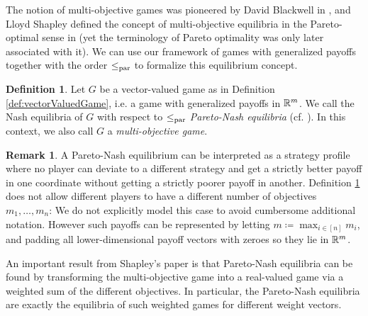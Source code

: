 \documentclass[a4paper,DIV=11]{scrreprt}
\theoremstyle{definition}
\newtheorem{defn}[thm]{Definition} %
\newtheorem{rem}[thm]{Remark}
\begin{document}
    The notion of multi-objective games was pioneered by David Blackwell in \cite{bib:blackwellVectorPayoffs}, and Lloyd Shapley defined the concept of multi-objective equilibria in the Pareto-optimal sense in \cite{bib:shapleyMultiobjectiveEquilibriumPoints} (yet the terminology of Pareto optimality was only later associated with it).
    We can use our framework of games with generalized payoffs together with the order $\leq_{\text{par}}$ to formalize this equilibrium concept.
    
    \begin{defn}
        \label{defn:multiObjectiveGame}
        Let $G$ be a vector-valued game as in Definition \ref{def:vectorValuedGame}, i.e. a game with generalized payoffs in $\mathbb{R}^m$.
        We call the Nash equilibria of $G$ with respect to $\leq_{\text{par}}$ \emph{Pareto-Nash equilibria} (cf. \cite{bib:paretoNashEquilibria}).
        In this context, we also call $G$ a \emph{multi-objective game}.
    \end{defn}

    \begin{rem}
        A Pareto-Nash equilibrium can be interpreted as a strategy profile where no player can deviate to a different strategy and get a strictly better payoff in one coordinate without getting a strictly poorer payoff in another. 
        Definition \ref{defn:multiObjectiveGame} does not allow different players to have a different number of objectives $m_1, \dots, m_n$: We do not explicitly model this case to avoid cumbersome additional notation. However such payoffs can be represented by letting $m \coloneqq \max_{i \in [n]} m_i$, and padding all lower-dimensional payoff vectors with zeroes so they lie in $\mathbb{R}^m$.
    \end{rem}

    An important result from Shapley's paper \cite{bib:shapleyMultiobjectiveEquilibriumPoints} is that Pareto-Nash equilibria can be found by transforming the multi-objective game into a real-valued game via a weighted sum of the different objectives. In particular, the Pareto-Nash equilibria are exactly the equilibria of such weighted games for different weight vectors.
    
\end{document}
